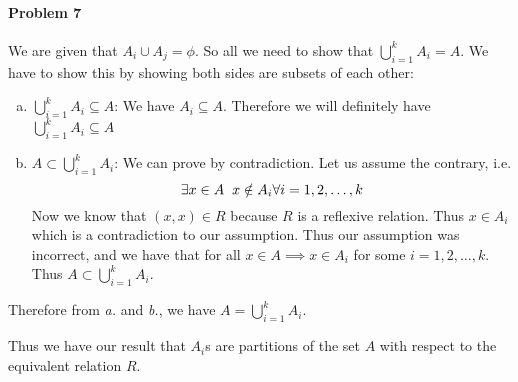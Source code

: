 \documentclass[12pt]{scrartcl}
\begin{document}
\paragraph*{Problem 7}

    We are given that $A_i \cup A_j = \phi$. So all we need to show that $\bigcup_{i=1}^k A_i = A$. We have to show this by showing both sides are subsets of each other:
    \begin{enumerate}[a.]
        \item $\bigcup_{i=1}^k A_i \subseteq A$: We have $A_i \subseteq A$. Therefore we will definitely have $\bigcup_{i=1}^k A_i \subseteq A$
        \item $A \subset \bigcup_{i=1}^k A_i$: We can prove by contradiction. Let us assume the contrary, i.e. 
        \[
            \exists x \in A \hspace{2mm} x \notin A_i \forall i = 1, 2, \ldots, k
        \]
        Now we know that $(x,x) \in R$ because $R$ is a reflexive relation. Thus $x \in A_i$ which is a contradiction to our assumption. Thus our assumption was incorrect, and we have that for all $x \in A \implies x \in A_i$ for some $i= 1, 2, \ldots, k$. Thus $A \subset \bigcup_{i=1}^k A_i$. 
    \end{enumerate}
    Therefore from \textit{a.} and \textit{b.}, we have $A = \bigcup_{i=1}^k A_i$. 
    
    Thus we have our result that $A_i$s are partitions of the set $A$ with respect to the equivalent relation $R$.
\end{document}
